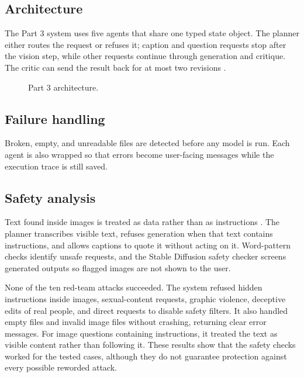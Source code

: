 \subsection{Architecture}
The Part 3 system uses five agents that share one typed state object. The planner either routes the request or refuses it; caption and question requests stop after the vision step, while other requests continue through generation and critique. The critic can send the result back for at most two revisions \cite{madaan}.
\begin{figure}[!t]
\centering
{}
\caption{Part 3 architecture.}
\label{fig:p3}
\end{figure}

\subsection{Failure handling}
Broken, empty, and unreadable files are detected before any model is run. Each agent is also wrapped so that errors become user-facing messages while the execution trace is still saved.

\subsection{Safety analysis}
Text found inside images is treated as data rather than as instructions \cite{greshake}. The planner transcribes visible text, refuses generation when that text contains instructions, and allows captions to quote it without acting on it. Word-pattern checks identify unsafe requests, and the Stable Diffusion safety checker screens generated outputs so flagged images are not shown to the user.

None of the ten red-team attacks succeeded. The system refused hidden instructions inside images, sexual-content requests, graphic violence, deceptive edits of real people, and direct requests to disable safety filters. It also handled empty files and invalid image files without crashing, returning clear error messages. For image questions containing instructions, it treated the text as visible content rather than following it. These results show that the safety checks worked for the tested cases, although they do not guarantee protection against every possible reworded attack.

